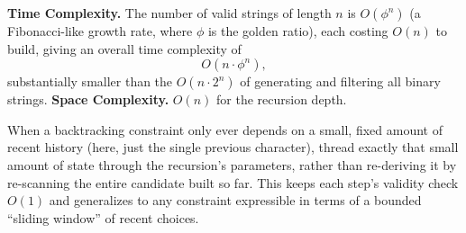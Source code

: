 \begin{complexitybox}
\textbf{Time Complexity.} The number of valid strings of length $n$ is
$O(\phi^n)$ (a Fibonacci-like growth rate, where $\phi$ is the golden
ratio), each costing $O(n)$ to build, giving an overall time complexity
of
\[
  O(n \cdot \phi^n),
\]
substantially smaller than the $O(n \cdot 2^n)$ of generating and
filtering all binary strings.
\textbf{Space Complexity.} $O(n)$ for the recursion depth.
\end{complexitybox}

\begin{takeawaybox}
When a backtracking constraint only ever depends on a small, fixed
amount of recent history (here, just the single previous character),
thread exactly that small amount of state through the recursion's
parameters, rather than re-deriving it by re-scanning the entire
candidate built so far. This keeps each step's validity check $O(1)$ and
generalizes to any constraint expressible in terms of a bounded
``sliding window'' of recent choices.
\end{takeawaybox}
